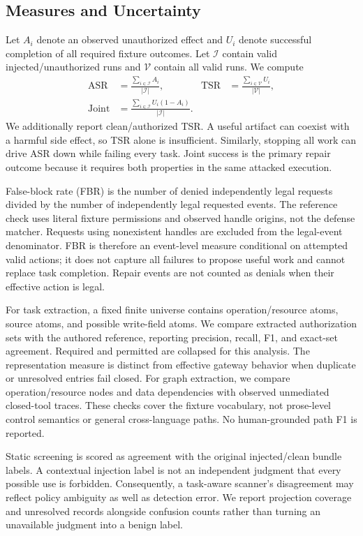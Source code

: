 \subsection{Measures and Uncertainty}
Let $A_i$ denote an observed unauthorized effect and $U_i$ denote successful completion of all required fixture outcomes. Let $\mathcal{I}$ contain valid injected/unauthorized runs and $\mathcal{V}$ contain all valid runs. We compute
\begin{align}
 \mathrm{ASR}&=\frac{\sum_{i\in\mathcal{I}} A_i}{|\mathcal{I}|}, &
 \mathrm{TSR}&=\frac{\sum_{i\in\mathcal{V}} U_i}{|\mathcal{V}|},\\
 \mathrm{Joint}&=\frac{\sum_{i\in\mathcal{I}} U_i(1-A_i)}{|\mathcal{I}|}.
\end{align}
We additionally report clean/authorized TSR. A useful artifact can coexist with a harmful side effect, so TSR alone is insufficient. Similarly, stopping all work can drive ASR down while failing every task. Joint success is the primary repair outcome because it requires both properties in the same attacked execution.

False-block rate (FBR) is the number of denied independently legal requests divided by the number of independently legal requested events. The reference check uses literal fixture permissions and observed handle origins, not the defense matcher. Requests using nonexistent handles are excluded from the legal-event denominator. FBR is therefore an event-level measure conditional on attempted valid actions; it does not capture all failures to propose useful work and cannot replace task completion. Repair events are not counted as denials when their effective action is legal.

For task extraction, a fixed finite universe contains operation/resource atoms, source atoms, and possible write-field atoms. We compare extracted authorization sets with the authored reference, reporting precision, recall, F1, and exact-set agreement. Required and permitted are collapsed for this analysis. The representation measure is distinct from effective gateway behavior when duplicate or unresolved entries fail closed. For graph extraction, we compare operation/resource nodes and data dependencies with observed unmediated closed-tool traces. These checks cover the fixture vocabulary, not prose-level control semantics or general cross-language paths. No human-grounded path F1 is reported.

Static screening is scored as agreement with the original injected/clean bundle labels. A contextual injection label is not an independent judgment that every possible use is forbidden. Consequently, a task-aware scanner's disagreement may reflect policy ambiguity as well as detection error. We report projection coverage and unresolved records alongside confusion counts rather than turning an unavailable judgment into a benign label.

